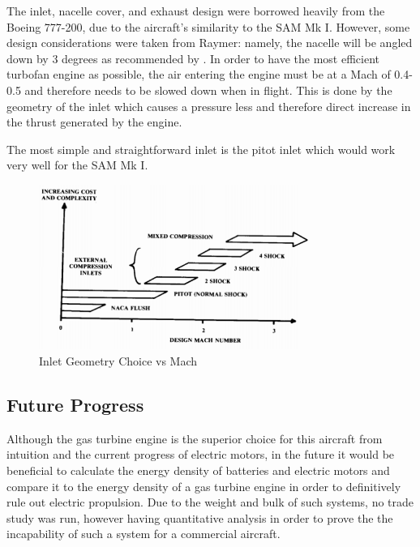 The inlet, nacelle cover, and exhaust design were borrowed heavily from the Boeing 777-200, due to the aircraft's similarity to the SAM Mk I. However, some design considerations were taken from Raymer: namely, the nacelle will be angled down by 3 degrees as recommended by \cite{raymer}. In order to have the most efficient turbofan engine as possible, the air entering the engine must be at a Mach of 0.4-0.5 and therefore needs to be slowed down when in flight. This is done by the geometry of the inlet which causes a pressure less and therefore direct increase in the thrust generated by the engine. 

The most simple and straightforward inlet is the pitot inlet which would work very well for the SAM Mk I.

\begin{figure} [h!]
    \centering
    \includegraphics[width=0.8\textwidth]{Photos/inletapplicability.PNG}
    \caption{Inlet Geometry Choice vs Mach}
    \label{fig:inlet}
\end{figure}


\subsection{Future Progress}

Although the gas turbine engine is the superior choice for this aircraft from intuition and the current progress of electric motors, in the future it would be beneficial to calculate the energy density of batteries and electric motors and compare it to the energy density of a gas turbine engine in order to definitively rule out electric propulsion. Due to the weight and bulk of such systems, no trade study was run, however having quantitative analysis in order to prove the the incapability of such a system for a commercial aircraft.

